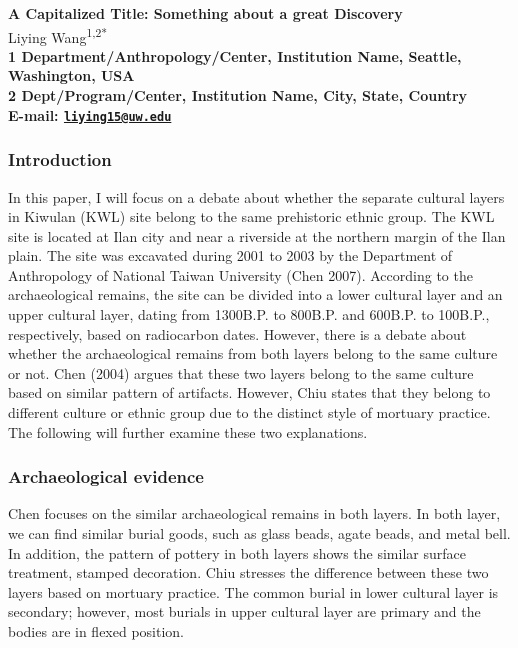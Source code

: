 \documentclass[10pt]{article}
\date{}
\begin{document}
\begin{flushleft}
{\Large
\textbf{A Capitalized Title: Something about a great Discovery}
}
\\
  Liying Wang\textsuperscript{1,2*}\\
\bf{1} Department/Anthropology/Center, Institution Name,  Seattle,  Washington,  USA
\\
\bf{2} Dept/Program/Center, Institution Name,  City,  State,  Country
\\

\textasteriskcentered{} E-mail:   \href{mailto:liying15@uw.edu}{\nolinkurl{liying15@uw.edu}}

\end{flushleft}

\subsubsection{Introduction}\label{introduction}

In this paper, I will focus on a debate about whether the separate
cultural layers in Kiwulan (KWL) site belong to the same prehistoric
ethnic group. The KWL site is located at Ilan city and near a riverside
at the northern margin of the Ilan plain. The site was excavated during
2001 to 2003 by the Department of Anthropology of National Taiwan
University (Chen 2007). According to the archaeological remains, the
site can be divided into a lower cultural layer and an upper cultural
layer, dating from 1300B.P. to 800B.P. and 600B.P. to 100B.P.,
respectively, based on radiocarbon dates. However, there is a debate
about whether the archaeological remains from both layers belong to the
same culture or not. Chen (2004) argues that these two layers belong to
the same culture based on similar pattern of artifacts. However, Chiu
states that they belong to different culture or ethnic group due to the
distinct style of mortuary practice. The following will further examine
these two explanations.

\subsubsection{Archaeological evidence}\label{archaeological-evidence}

Chen focuses on the similar archaeological remains in both layers. In
both layer, we can find similar burial goods, such as glass beads, agate
beads, and metal bell. In addition, the pattern of pottery in both
layers shows the similar surface treatment, stamped decoration. Chiu
stresses the difference between these two layers based on mortuary
practice. The common burial in lower cultural layer is secondary;
however, most burials in upper cultural layer are primary and the bodies
are in flexed position.
\end{document}
